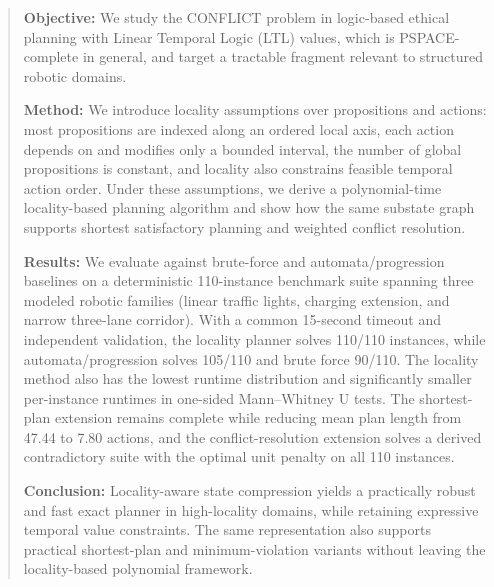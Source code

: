 \documentclass[]{jair}
\begin{document}
\begin{abstract}
\textbf{Objective:} We study the CONFLICT problem in logic-based ethical planning with Linear Temporal Logic (LTL) values, which is PSPACE-complete in general, and target a tractable fragment relevant to structured robotic domains.

\textbf{Method:} We introduce locality assumptions over propositions and actions: most propositions are indexed along an ordered local axis, each action depends on and modifies only a bounded interval, the number of global propositions is constant, and locality also constrains feasible temporal action order. Under these assumptions, we derive a polynomial-time locality-based planning algorithm and show how the same substate graph supports shortest satisfactory planning and weighted conflict resolution.

\textbf{Results:} We evaluate against brute-force and automata/progression baselines on a deterministic 110-instance benchmark suite spanning three modeled robotic families (linear traffic lights, charging extension, and narrow three-lane corridor). With a common 15-second timeout and independent validation, the locality planner solves 110/110 instances, while automata/progression solves 105/110 and brute force 90/110. The locality method also has the lowest runtime distribution and significantly smaller per-instance runtimes in one-sided Mann--Whitney U tests. The shortest-plan extension remains complete while reducing mean plan length from 47.44 to 7.80 actions, and the conflict-resolution extension solves a derived contradictory suite with the optimal unit penalty on all 110 instances.

\textbf{Conclusion:} Locality-aware state compression yields a practically robust and fast exact planner in high-locality domains, while retaining expressive temporal value constraints. The same representation also supports practical shortest-plan and minimum-violation variants without leaving the locality-based polynomial framework.
\end{abstract}

\end{document}
